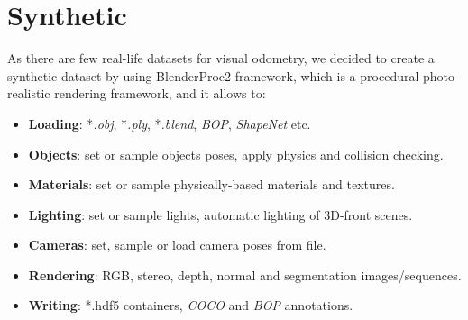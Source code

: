 
\section{Synthetic}\label{sec:synthetic}

As there are few real-life datasets for visual odometry, we decided to create a synthetic dataset by using BlenderProc2 framework,
which is a procedural photo-realistic rendering framework, and it allows to:
\begin{itemize}
    \item \textbf{Loading}: *\textit{.obj}, *\textit{.ply}, *\textit{.blend}, \textit{BOP}, \textit{ShapeNet} etc.
    \item \textbf{Objects}: set or sample objects poses, apply physics and collision checking.
    \item \textbf{Materials}: set or sample physically-based materials and textures.
    \item \textbf{Lighting}: set or sample lights, automatic lighting of 3D-front scenes.
    \item \textbf{Cameras}: set, sample or load camera poses from file.
    \item \textbf{Rendering}: RGB, stereo, depth, normal and segmentation images/sequences.
    \item \textbf{Writing}: *.hdf5 containers, \textit{COCO} and \textit{BOP} annotations.
\end{itemize}

